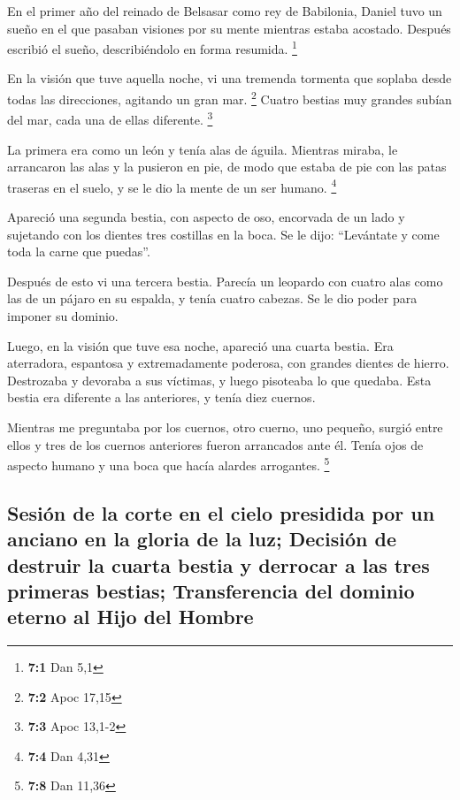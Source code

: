  En el primer año del reinado de Belsasar como rey de
Babilonia, Daniel tuvo un sueño en el que pasaban visiones por su mente
mientras estaba acostado. Después escribió el sueño, describiéndolo en
forma resumida. \footnote{\textbf{7:1} Dan 5,1}

 En la visión que tuve aquella noche, vi una tremenda
tormenta que soplaba desde todas las direcciones, agitando un gran mar.
\footnote{\textbf{7:2} Apoc 17,15}  Cuatro bestias muy
grandes subían del mar, cada una de ellas diferente. \footnote{\textbf{7:3}
  Apoc 13,1-2}

 La primera era como un león y tenía alas de águila.
Mientras miraba, le arrancaron las alas y la pusieron en pie, de modo
que estaba de pie con las patas traseras en el suelo, y se le dio la
mente de un ser humano. \footnote{\textbf{7:4} Dan 4,31}

 Apareció una segunda bestia, con aspecto de oso,
encorvada de un lado y sujetando con los dientes tres costillas en la
boca. Se le dijo: ``Levántate y come toda la carne que puedas''.

 Después de esto vi una tercera bestia. Parecía un
leopardo con cuatro alas como las de un pájaro en su espalda, y tenía
cuatro cabezas. Se le dio poder para imponer su dominio.

 Luego, en la visión que tuve esa noche, apareció una
cuarta bestia. Era aterradora, espantosa y extremadamente poderosa, con
grandes dientes de hierro. Destrozaba y devoraba a sus víctimas, y luego
pisoteaba lo que quedaba. Esta bestia era diferente a las anteriores, y
tenía diez cuernos.

 Mientras me preguntaba por los cuernos, otro cuerno, uno
pequeño, surgió entre ellos y tres de los cuernos anteriores fueron
arrancados ante él. Tenía ojos de aspecto humano y una boca que hacía
alardes arrogantes. \footnote{\textbf{7:8} Dan 11,36}

\hypertarget{sesiuxf3n-de-la-corte-en-el-cielo-presidida-por-un-anciano-en-la-gloria-de-la-luz-decisiuxf3n-de-destruir-la-cuarta-bestia-y-derrocar-a-las-tres-primeras-bestias-transferencia-del-dominio-eterno-al-hijo-del-hombre}{%
\subsection{Sesión de la corte en el cielo presidida por un anciano en
la gloria de la luz; Decisión de destruir la cuarta bestia y derrocar a
las tres primeras bestias; Transferencia del dominio eterno al Hijo del
Hombre}\label{sesiuxf3n-de-la-corte-en-el-cielo-presidida-por-un-anciano-en-la-gloria-de-la-luz-decisiuxf3n-de-destruir-la-cuarta-bestia-y-derrocar-a-las-tres-primeras-bestias-transferencia-del-dominio-eterno-al-hijo-del-hombre}}

